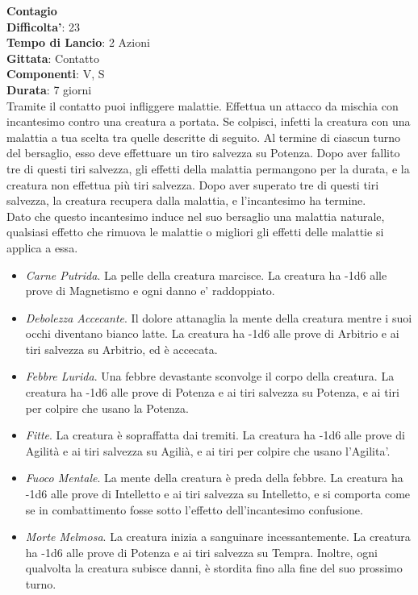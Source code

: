 \begin{multicols}{2}
\medskip\textbf{Contagio}\\
\textbf{Difficolta'}: 23\\
\textbf{Tempo di Lancio}: 2 Azioni\\
\textbf{Gittata}: Contatto\\
\textbf{Componenti}: V, S\\
\textbf{Durata}: 7 giorni\\
Tramite il contatto puoi infliggere malattie. Effettua un attacco da mischia con incantesimo contro una creatura a portata. Se colpisci, infetti la creatura con una malattia a tua scelta tra quelle descritte di seguito. Al termine di ciascun turno del bersaglio, esso deve effettuare un tiro salvezza su Potenza. Dopo aver fallito tre di questi tiri salvezza, gli effetti della malattia permangono per la durata, e la creatura non effettua più tiri salvezza. Dopo aver superato tre di questi tiri salvezza, la creatura recupera dalla malattia, e l’incantesimo ha termine. \\
Dato che questo incantesimo induce nel suo bersaglio una malattia naturale, qualsiasi effetto che rimuova le malattie o migliori gli effetti delle malattie si applica a essa.\\
\begin{itemize}
	\item 
	\textit{Carne Putrida}. La pelle della creatura marcisce. La creatura ha -1d6 alle prove di Magnetismo e ogni danno e' raddoppiato.
\item 
	\textit{Debolezza Accecante}. Il dolore attanaglia la mente della creatura mentre i suoi occhi diventano bianco latte. La creatura ha -1d6  alle prove di Arbitrio e ai tiri salvezza su Arbitrio, ed è accecata.
\item 
   \textit{Febbre Lurida}. Una febbre devastante sconvolge il corpo della creatura. La creatura ha -1d6 alle prove di Potenza e ai tiri salvezza su Potenza, e ai tiri per
colpire che usano la Potenza.
\item 
\textit{Fitte}. La creatura è sopraffatta dai tremiti. La creatura ha -1d6 alle prove di Agilità e ai tiri salvezza su Agilià, e ai tiri per colpire che usano l'Agilita'.
\item 
\textit{Fuoco Mentale}. La mente della creatura è preda della febbre. La creatura ha -1d6 alle prove di Intelletto e ai tiri salvezza su Intelletto, e si comporta come se in combattimento fosse sotto l’effetto dell’incantesimo confusione.
\item 
\textit{Morte Melmosa}. La creatura inizia a sanguinare incessantemente. La creatura ha -1d6 alle prove di Potenza e ai tiri salvezza su Tempra. Inoltre, ogni qualvolta la creatura subisce danni, è stordita fino alla fine del suo prossimo turno.
\end{itemize}


\end{multicols}
